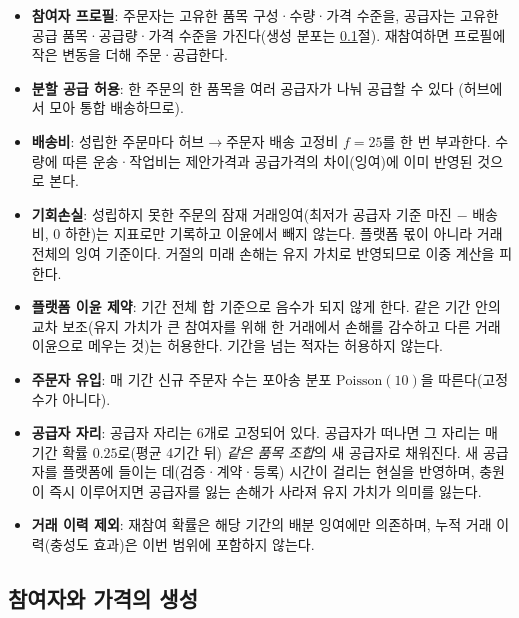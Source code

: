 \documentclass[11pt,a4paper]{article}
\begin{document}
\begin{itemize}[leftmargin=1.5em]
  \item \textbf{참여자 프로필}: 주문자는 고유한 품목 구성·수량·가격 수준을,
        공급자는 고유한 공급 품목·공급량·가격 수준을 가진다(생성 분포는 \ref{sec:gen}절).
        재참여하면 프로필에 작은 변동을 더해 주문·공급한다.
  \item \textbf{분할 공급 허용}: 한 주문의 한 품목을 여러 공급자가 나눠 공급할 수 있다
        (허브에서 모아 통합 배송하므로).
  \item \textbf{배송비}: 성립한 주문마다 허브$\to$주문자 배송 고정비 $f=25$를 한 번 부과한다.
        수량에 따른 운송·작업비는 제안가격과 공급가격의 차이(잉여)에 이미 반영된 것으로 본다.
  \item \textbf{기회손실}: 성립하지 못한 주문의 잠재 거래잉여(최저가 공급자 기준 마진 $-$ 배송비, 0 하한)는
        지표로만 기록하고 이윤에서 빼지 않는다. 플랫폼 몫이 아니라 거래 전체의 잉여 기준이다.
        거절의 미래 손해는 유지 가치로 반영되므로 이중 계산을 피한다.
  \item \textbf{플랫폼 이윤 제약}: 기간 전체 합 기준으로 음수가 되지 않게 한다.
        같은 기간 안의 교차 보조(유지 가치가 큰 참여자를 위해 한 거래에서 손해를 감수하고
        다른 거래 이윤으로 메우는 것)는 허용한다. 기간을 넘는 적자는 허용하지 않는다.
  \item \textbf{주문자 유입}: 매 기간 신규 주문자 수는 포아송 분포 $\mathrm{Poisson}(10)$을 따른다(고정 수가 아니다).
  \item \textbf{공급자 자리}: 공급자 자리는 6개로 고정되어 있다. 공급자가 떠나면 그 자리는
        매 기간 확률 $0.25$로(평균 4기간 뒤) \emph{같은 품목 조합}의 새 공급자로 채워진다.
        새 공급자를 플랫폼에 들이는 데(검증·계약·등록) 시간이 걸리는 현실을 반영하며,
        충원이 즉시 이루어지면 공급자를 잃는 손해가 사라져 유지 가치가 의미를 잃는다.
  \item \textbf{거래 이력 제외}: 재참여 확률은 해당 기간의 배분 잉여에만 의존하며,
        누적 거래 이력(충성도 효과)은 이번 범위에 포함하지 않는다.
\end{itemize}

\subsection{참여자와 가격의 생성}\label{sec:gen}
\end{document}
